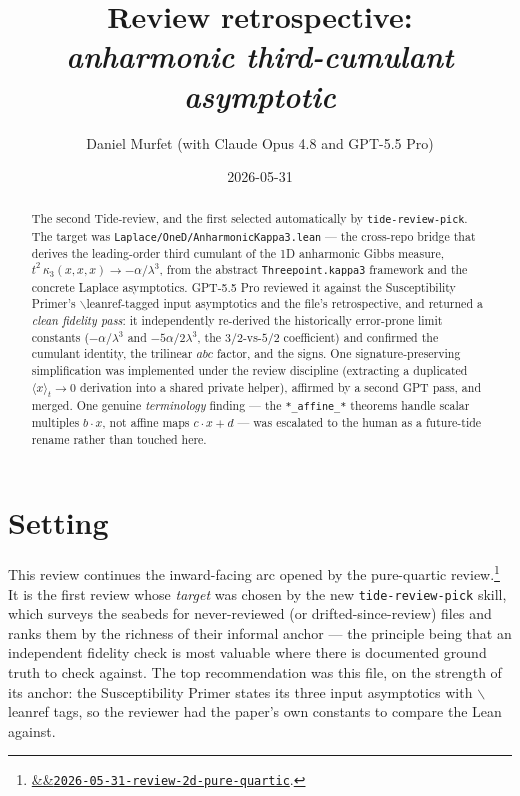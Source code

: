 \documentclass[11pt]{article}
\title{Review retrospective:\\\emph{anharmonic third-cumulant asymptotic}}
\author{Daniel Murfet (with Claude Opus 4.8 and GPT-5.5 Pro)}
\date{2026-05-31}
\newcommand{\reviewref}[2][]{\href{https://therisensea.org/reviews/#2/}{\ifx&#1&\texttt{#2}\else#1\fi}}
\begin{document}
\maketitle

\begin{abstract}
The second Tide-review, and the first selected automatically by
\texttt{tide-review-pick}. The target was \texttt{Laplace/OneD/AnharmonicKappa3.lean}
--- the cross-repo bridge that derives the leading-order third cumulant of the 1D
anharmonic Gibbs measure, $t^2\,\kappa_3(x,x,x)\to-\alpha/\lambda^3$, from the
abstract \texttt{Threepoint.kappa3} framework and the concrete Laplace asymptotics.
GPT-5.5 Pro reviewed it against the Susceptibility Primer's $\backslash$leanref-tagged input
asymptotics and the file's retrospective, and returned a \emph{clean fidelity pass}:
it independently re-derived the historically error-prone limit constants
($-\alpha/\lambda^3$ and $-5\alpha/2\lambda^3$, the $3/2$-vs-$5/2$ coefficient) and
confirmed the cumulant identity, the trilinear $abc$ factor, and the signs. One
signature-preserving simplification was implemented under the review discipline
(extracting a duplicated $\langle x\rangle_t\to0$ derivation into a shared private
helper), affirmed by a second GPT pass, and merged. One genuine
\emph{terminology} finding --- the \texttt{*\_affine\_*} theorems handle scalar
multiples $b\cdot x$, not affine maps $c\cdot x+d$ --- was escalated to the human as
a future-tide rename rather than touched here.
\end{abstract}

\section{Setting}

This review continues the inward-facing arc opened by the pure-quartic
review.\footnote{\reviewref{2026-05-31-review-2d-pure-quartic}.} It is the first
review whose \emph{target} was chosen by the new \texttt{tide-review-pick} skill,
which surveys the seabeds for never-reviewed (or drifted-since-review) files and
ranks them by the richness of their informal anchor --- the principle being that an
independent fidelity check is most valuable where there is documented ground truth
to check against. The top recommendation was this file, on the strength of its
anchor: the Susceptibility Primer states its three input asymptotics with
$\backslash$leanref tags, so the reviewer had the paper's own constants to compare the Lean
against.
\end{document}
